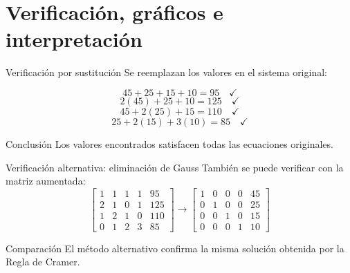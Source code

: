 \documentclass[aspectratio=169]{beamer}
\begin{document}
\section{Verificación, gráficos e interpretación}

\begin{frame}[shrink=5]{Verificación por sustitución}
Se reemplazan los valores en el sistema original:

\[
45+25+15+10=95\quad \checkmark
\]
\[
2(45)+25+10=125\quad \checkmark
\]
\[
45+2(25)+15=110\quad \checkmark
\]
\[
25+2(15)+3(10)=85\quad \checkmark
\]

\begin{block}{Conclusión}
Los valores encontrados satisfacen todas las ecuaciones originales.
\end{block}
\end{frame}

\begin{frame}[shrink=8]{Verificación alternativa: eliminación de Gauss}
También se puede verificar con la matriz aumentada:
\[
\left[\begin{array}{cccc|c}
1&1&1&1&95\\
2&1&0&1&125\\
1&2&1&0&110\\
0&1&2&3&85
\end{array}\right]
\longrightarrow
\left[\begin{array}{cccc|c}
1&0&0&0&45\\
0&1&0&0&25\\
0&0&1&0&15\\
0&0&0&1&10
\end{array}\right]
\]

\begin{block}{Comparación}
El método alternativo confirma la misma solución obtenida por la Regla de Cramer.
\end{block}
\end{frame}
\end{document}
